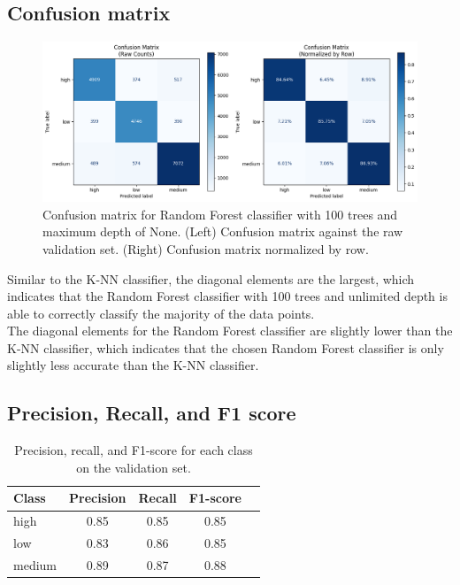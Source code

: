 \documentclass[12pt]{article}
\begin{document}
\subsection{Confusion matrix}
\noindent
\begin{figure}[H]
\centering
\includegraphics[width=1\textwidth]{figures/rf_confusion_matrix.png}
\caption{Confusion matrix for Random Forest classifier with 100 trees and maximum depth of None. (Left) Confusion matrix against the raw validation set. (Right) Confusion matrix normalized by row.}
\label{fig:rf_confusion_matrix}
\end{figure}

Similar to the K-NN classifier, the diagonal elements are the largest, which indicates that the Random Forest classifier with 100 trees and unlimited depth is able to correctly classify the majority of the data points. 
\\
The diagonal elements for the Random Forest classifier are slightly lower than the K-NN classifier, which indicates that the chosen Random Forest classifier is only slightly less accurate than the K-NN classifier.

\vspace{20pt}

\subsection{Precision, Recall, and F1 score}
\noindent

\begin{table}[h!]
\centering
\begin{tabular}{lcccc}
\hline
\textbf{Class} & \textbf{Precision} & \textbf{Recall} & \textbf{F1-score} \\
\hline
high   & 0.85 & 0.85 & 0.85 & \\
low    & 0.83 & 0.86 & 0.85 & \\
medium & 0.89 & 0.87 & 0.88 & \\
\hline
\end{tabular}
\caption{Precision, recall, and F1-score for each class on the validation set.}
\label{tab:rf_classification_report}
\end{table}
\end{document}
